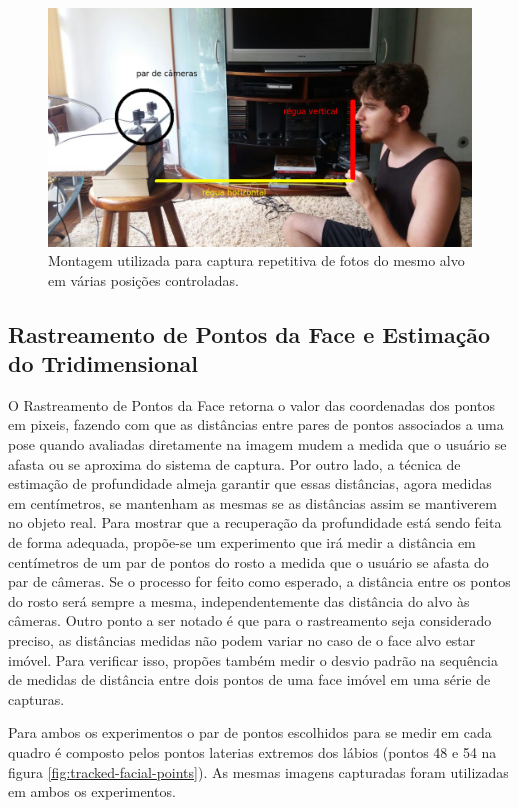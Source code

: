 \begin{figure}
\centering
\includegraphics[width=0.8\linewidth]{figs/setupExperimento-comentado.png}
\caption{Montagem utilizada para captura repetitiva de fotos do mesmo alvo em várias posições controladas.}
\label{fig:exp-montagem}
\end{figure}

\subsection{Rastreamento de Pontos da Face e Estimação do Tridimensional}

O Rastreamento de Pontos da Face retorna o valor das coordenadas dos pontos em pixeis, fazendo com que as distâncias entre pares de pontos associados a uma pose quando avaliadas diretamente na imagem mudem a medida que o usuário se afasta ou se aproxima do sistema de captura. Por outro lado, a técnica de estimação de profundidade almeja garantir que essas distâncias, agora medidas em centímetros, se mantenham as mesmas se as distâncias assim se mantiverem no objeto real. Para mostrar que a recuperação da profundidade está sendo feita de forma adequada, propõe-se um experimento que irá medir a distância em centímetros de um par de pontos do rosto a medida que o usuário se afasta do par de câmeras. Se o processo for feito como esperado, a distância entre os pontos do rosto será sempre a mesma, independentemente das distância do alvo às câmeras.  Outro ponto a ser notado é que para o rastreamento seja considerado preciso, as distâncias medidas não podem variar no caso de o face alvo estar imóvel. Para verificar isso, propões também medir o desvio padrão na sequência de medidas de distância entre dois pontos de uma face imóvel em uma série de capturas.


Para ambos os experimentos o par de pontos escolhidos para se medir em cada quadro é composto pelos pontos laterias extremos dos lábios (pontos 48 e 54 na figura \ref{fig:tracked-facial-points}). As mesmas imagens capturadas foram utilizadas em ambos os experimentos.

